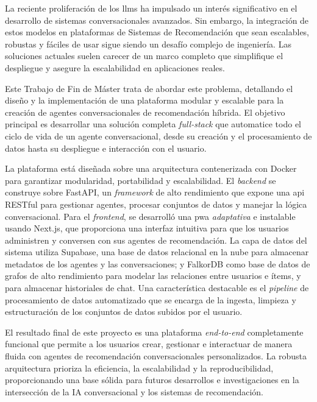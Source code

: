 La reciente proliferación de los \acp{llm} ha impulsado un interés significativo en el desarrollo de sistemas conversacionales avanzados. Sin embargo, la integración de estos modelos en plataformas de Sistemas de Recomendación que sean escalables, robustas y fáciles de usar sigue siendo un desafío complejo de ingeniería. Las soluciones actuales suelen carecer de un marco completo que simplifique el despliegue y asegure la escalabilidad en aplicaciones reales.

Este Trabajo de Fin de Máster trata de abordar este problema, detallando el diseño y la implementación de una plataforma modular y escalable para la creación de agentes conversacionales de recomendación híbrida. El objetivo principal es desarrollar una solución completa \textit{full-stack} que automatice todo el ciclo de vida de un agente conversacional, desde su creación y el procesamiento de datos hasta su despliegue e interacción con el usuario.

La plataforma está diseñada sobre una arquitectura contenerizada con Docker para garantizar modularidad, portabilidad y escalabilidad. El \textit{backend} se construye sobre FastAPI, un \textit{framework} de alto rendimiento que expone una \ac{api} RESTful para gestionar agentes, procesar conjuntos de datos y manejar la lógica conversacional. Para el \textit{frontend}, se desarrolló una \ac{pwa} \textit{adaptativa} e instalable usando Next.js, que proporciona una interfaz intuitiva para que los usuarios administren y conversen con sus agentes de recomendación. La capa de datos del sistema utiliza Supabase, una base de datos relacional en la nube para almacenar metadatos de los agentes y las conversaciones; y FalkorDB como base de datos de grafos de alto rendimiento para modelar las relaciones entre usuarios e ítems, y para almacenar historiales de chat. Una característica destacable es el \textit{pipeline} de procesamiento de datos automatizado que se encarga de la ingesta, limpieza y estructuración de los conjuntos de datos subidos por el usuario.

El resultado final de este proyecto es una plataforma \textit{end-to-end} completamente funcional que permite a los usuarios crear, gestionar e interactuar de manera fluida con agentes de recomendación conversacionales personalizados. La robusta arquitectura prioriza la eficiencia, la escalabilidad y la reproducibilidad, proporcionando una base sólida para futuros desarrollos e investigaciones en la intersección de la IA conversacional y los sistemas de recomendación.

